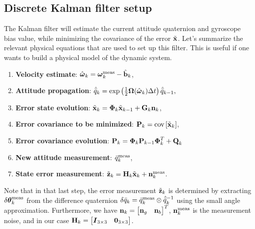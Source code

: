 \subsection{Discrete Kalman filter setup}
The Kalman filter will estimate the current attitude quaternion and gyroscope bias value, while minimizing the covariance of the error $\tilde{\textrm{\textbf{x}}}$. Let's summarize the relevant physical equations that are used to set up this filter. This is useful if one wants to build a physical model of the dynamic system.
\begin{enumerate}
\item \textbf{Velocity estimate}: $\hat{\boldsymbol\omega}_{k} = \boldsymbol\omega_k^{\textrm{meas}} - \hat{\textrm{\textbf{b}}}_{k}$,
\item \textbf{Attitude propagation}: $\hat{\bar{q}}_{k} = \exp\left(\frac{1}{2}\boldsymbol\Omega(\hat{\boldsymbol\omega}_{k})\Delta t\right)\hat{\bar{q}}_{k-1},$
\item \textbf{Error state evolution}: $\tilde{\textrm{\textbf{x}}}_{k}  = \boldsymbol{\Phi}_{k}\tilde{\textrm{\textbf{x}}}_{k-1} + \textrm{\textbf{G}}_{k}\textrm{\textbf{n}}_{k}$,
\item \textbf{Error covariance to be minimized}: $\textrm{\textbf{P}}_{k} = \textrm{cov}\left[ \tilde{\textrm{\textbf{x}}}_{k} \right]$,
\item \textbf{Error covariance evolution}: $\textrm{\textbf{P}}_{k}  =   \boldsymbol{\Phi}_k \textrm{\textbf{P}}_{k-1}\boldsymbol{\Phi}^T_k + \textrm{\textbf{Q}}_k$
\item \textbf{New attitude measurement}: $\bar{q}^{\textrm{meas}}_k$, 
\item \textbf{State error measurement}: $\tilde{\textrm{\textbf{z}}}_k = \textrm{\textbf{H}}_k\tilde{\textrm{\textbf{x}}}_k + \textbf{n}^\textrm{meas}_k$. 
\end{enumerate}

Note that in that last step, the error measurement $\tilde{\textrm{\textbf{z}}}_k$ is determined by extracting $\delta\boldsymbol\theta_k^{\textrm{meas}}$ from the difference quaternion $\delta\bar{q}_k = \bar{q}^{\textrm{meas}}_k \otimes \hat{\bar{q}}^{-1}_{k}$ using the small angle approximation. Furthermore, we have $\textrm{\textbf{n}}_k = \begin{bmatrix} \textbf{n}_g & \textbf{n}_b \end{bmatrix}^T$, $\textbf{n}^\textrm{meas}_k$ is the measurement noise, and in our case $\textrm{\textbf{H}}_k = \begin{bmatrix} \boldsymbol{I}_{3\times 3} & \boldsymbol{0}_{3\times 3} \end{bmatrix}$.

